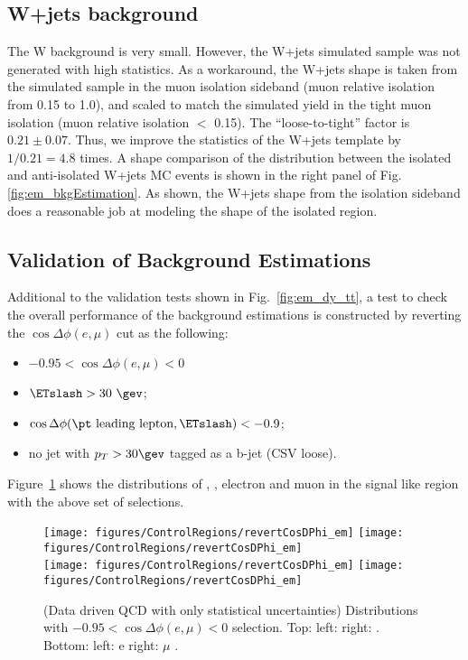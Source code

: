 \subsection{W+jets background}
\label{sec:em_w_bkg_validation}
The W background is very small.  However, the W+jets simulated sample was not 
generated with high statistics.  As a workaround, the W+jets shape is taken 
from the simulated sample in the muon isolation sideband (muon relative 
isolation from 0.15 to 1.0), and scaled to match the simulated yield in the 
tight muon isolation (muon relative isolation $<$ 0.15).  The ``loose-to-tight'' 
factor is $0.21 \pm 0.07$. Thus, we improve the statistics of the W+jets 
template by $1/0.21 = 4.8$ times. A shape comparison of the \meffemu distribution 
between the isolated and anti-isolated W+jets MC events is shown in the right 
panel of Fig. \ref{fig:em_bkgEstimation}. As shown, the W+jets shape from the 
isolation sideband does a reasonable job at modeling the shape of the isolated 
region.

\subsection{Validation of Background Estimations}
Additional to the validation tests shown in Fig.~\ref{fig:em_dy_tt}, a test 
to check the overall performance of the background estimations is constructed 
by reverting the $\cos{\Delta \phi (e,\mu)}$ cut as the following:
\begin{itemize}
  \item $ -0.95 < \cos{\Delta \phi (e,\mu)} < 0$
  \item $\ETslash>30~\gev$;
  \item $\cos{\Delta \phi (\pt\text{ leading lepton},\ETslash)}<-0.9$;
  \item no jet with $p_T>30\gev$ tagged as a b-jet (CSV loose)\quad.
\end{itemize}

Figure~\ref{fig:revertCosDPhi_em} shows the distributions of \meffemu, \ETslash, 
electron \pt and muon \pt in the signal like region with the above set of selections. 

\begin{figure}\centering
  \texttt{[image: figures/ControlRegions/revertCosDPhi\_em]}
  \texttt{[image: figures/ControlRegions/revertCosDPhi\_em]}\\
  \texttt{[image: figures/ControlRegions/revertCosDPhi\_em]}
  \texttt{[image: figures/ControlRegions/revertCosDPhi\_em]}
  \caption{\label{fig:revertCosDPhi_em} (Data driven QCD with only statistical uncertainties) 
 Distributions with $-0.95 < \cos{\Delta \phi (e,\mu)} < 0$ selection. Top: left: 
\meffemu right: \ETslash. Bottom: left: e \pt right: $\mu$ \pt.}
\end{figure}

